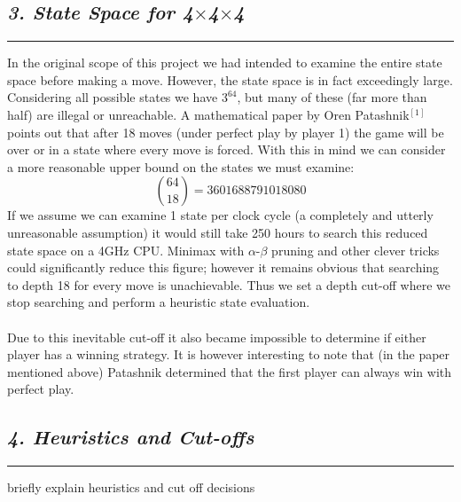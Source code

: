 \documentclass[10pt]{article}
\begin{document}
\begin{multicols}{2}
\subsection*{\emph { \textmd{3. State Space for 4$\times$4$\times$4}}}
\hrule
\vspace{0.4cm}

In the original scope of this project we had intended to examine the entire state space
before making a move. However, the state space is in fact exceedingly large. Considering all
possible states we have $3^{64}$, but many of these (far more than half) are illegal or unreachable.
A mathematical paper by Oren Patashnik$^{[1]}$ points out that after 18 moves (under perfect play by player 1)
the game will be over or in a state where every move is forced. With this in mind we can 
consider a more reasonable upper bound on the states we must examine:
{\small \[\binom{64}{18} = 3601688791018080\]}
If we assume we can examine 1 state per clock cycle (a completely and utterly unreasonable assumption) it would
still take 250 hours to search this reduced state space on a 4GHz CPU. Minimax with $\alpha$-$\beta$ pruning
and other clever tricks could significantly reduce this figure; however it remains obvious that
searching to depth 18 for every move is unachievable. Thus we set a depth cut-off where we stop
searching and perform a heuristic state evaluation.\\\\
Due to this inevitable cut-off it also became impossible to determine if either
player has a winning strategy. It is however interesting to note that (in the paper
mentioned above) Patashnik determined that the first player can always win with perfect play. 

\subsection*{\emph { \textmd{4. Heuristics and Cut-offs}}}
\hrule
\vspace{0.4cm}
briefly explain heuristics and cut off decisions\\




\end{multicols}
\end{document}
